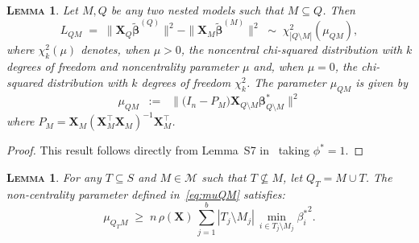 \documentclass[
  12pt]{article}
\newcommand{\M}{\mathcal{M}}
\newcommand{\bbeta}{\boldsymbol{\beta}}
\newcommand{\bX}{\mathbf{X}}
\newtheorem{lem}[thm]{\textsc{Lemma}}
\begin{document}
\begin{lem}\label{lemma:s7}
    Let $M,Q$ be any two nested models such that $M \subseteq Q$. Then
$$
L_{QM}\;=\;\|\bX_{Q}\tilde{\bbeta}^{(Q)}\|^2-\|\bX_{M}\tilde{\bbeta}^{(M)}\|^2\;\sim\; \chi_{|Q\setminus M|}^2\left(\mu_{Q M}\right), 
$$
where $\chi_{k}^2(\mu)$ denotes, when $\mu>0$, the noncentral chi-squared distribution with $k$ degrees of freedom and noncentrality parameter $\mu$ and, when $\mu=0$, the chi-squared distribution with $k$ degrees of freedom $\chi_{k}^2$. The parameter $\mu_{QM}$ is given by \begin{equation}\label{eq:muQM}
    \mu_{QM}\;\;:=\;\;\|\big(I_n-P_M\big) \bX_{Q\setminus M} \bbeta^*_{Q\setminus M}\|^2
\end{equation}
where $P_M=\bX_{M}\left(\bX_{M}^{\top} \bX_{M}\right)^{-1} \bX_{M}^{\top}$.
\end{lem}
\begin{proof}
    This result follows directly from Lemma~S7 in~\cite{rossell2022concentration} taking $\phi^*=1$.
\end{proof}



\begin{lem}\label{lem:boundrhogen}
 For any $T\subseteq S$ and $M\in\M$ such that $T\not\subseteq M$, let $Q_T=M \cup T$. The non-centrality parameter defined in~\eqref{eq:muQM} satisfies: 
\begin{equation}
    \mu_{Q_TM}\; \geq \;n\,\rho(\bX)\,\sum_{j=1}^b|T_j\setminus M_j|\,\min_{i\in T_j\setminus M_j}{\beta_{i}^*}^2.
\end{equation}
\end{lem}
\end{document}
